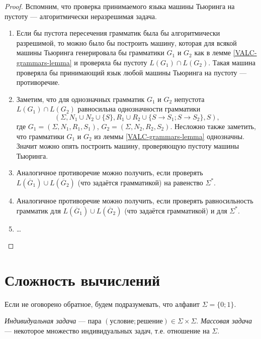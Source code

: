 \documentclass[12pt,a4paper]{article}
\begin{document}
    \begin{proof}
        Вспомним, что проверка принимаемого языка машины Тьюринга на пустоту --- алгоритмически неразрешимая задача.

        \begin{enumerate}
            \item Если бы пустота пересечения грамматик была бы алгоритмически разрешимой, то можно было бы построить машину, которая для всякой машины Тьюринга генерировала бы грамматики $G_1$ и $G_2$ как в лемме \ref{VALC-grammars-lemma} и проверяла бы пустоту $L(G_1) \cap L(G_2)$. Такая машина проверяла бы принимающий язык любой машины Тьюринга на пустоту --- противоречие.
            \item Заметим, что для однозначных грамматик $G_1$ и $G_2$ непустота $L(G_1) \cap L(G_2)$ равносильна однозначности грамматики
                \[(\Sigma, N_1 \cup N_2 \cup \{S\}, R_1 \cup R_2 \cup \{S \to S_1; S \to S_2\}, S),\]
                где $G_1 = (\Sigma, N_1, R_1, S_1)$, $G_2 = (\Sigma, N_2, R_2, S_2)$.
                Несложно также заметить, что грамматики $G_1$ и $G_2$ из леммы \ref{VALC-grammars-lemma} однозначны. Значит можно опять построить машину, проверяющую пустоту машины Тьюринга.
            \item Аналогичное противоречие можно получить, если проверять $L(\overline{G}_1) \cup L(\overline{G}_2)$ (что задаётся грамматикой) на равенство $\Sigma^*$.
            \item Аналогичное противоречие можно получить, если проверять равносильность грамматик для $L(\overline{G}_1) \cup L(\overline{G}_2)$ (что задаётся грамматикой) и для $\Sigma^*$.
            \item \dots {}
        \end{enumerate}
    \end{proof}

    \section{Сложность вычислений}

    \begin{remark*}
        Если не оговорено обратное, будем подразумевать, что алфавит $\Sigma = \{0; 1\}$.
    \end{remark*}

    \begin{definition}
        \emph{Индивидуальная задача} --- пара $(\text{условие}; \text{решение}) \in \Sigma \times \Sigma$. \emph{Массовая задача} --- некоторое множество индивидуальных задач, т.е. отношение на $\Sigma$.
    \end{definition}
\end{document}
